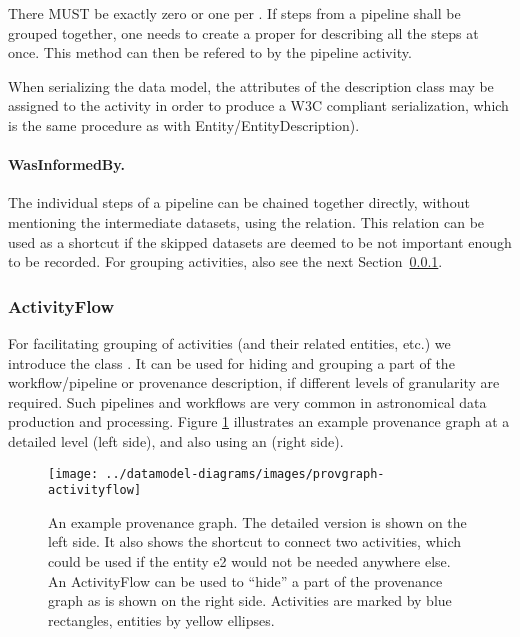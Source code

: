 There MUST be exactly zero or one  per . If steps from a 
pipeline shall be grouped together, one needs to create a proper 
 for describing all the steps at once. This method can then 
be refered to by the pipeline activity. 

When serializing the data model, the attributes
of the description class may be assigned to the activity in order to produce 
a W3C compliant serialization, which is the same procedure as with
 Entity\slash{}EntityDescription).


\paragraph{WasInformedBy.}
The individual steps of a pipeline can be chained together directly, without
mentioning the intermediate datasets, using the  relation.
This relation can be used as a shortcut if the skipped datasets are deemed
to be not important enough to be recorded. For grouping activities, also see
the next Section~\ref{sec:activityflow}.


\subsubsection{ActivityFlow}\label{sec:activityflow}
For facilitating grouping of activities (and their related entities, etc.) we
introduce the class . It can be used for hiding and grouping
a part of the workflow/pipeline  or provenance  description, if different levels
of granularity are required. Such pipelines and workflows are very common in
astronomical data production and processing. Figure
\ref{fig:provgraph-activityflow} illustrates an example provenance graph at a
detailed level (left side), and also using an  (right
side).


\begin{figure}[h]
\centering
\texttt{[image: ../datamodel-diagrams/images/provgraph-activityflow]}
\caption[Example provenance graph with ]{An example provenance graph. The detailed version is shown on the left side. It also shows
the shortcut  to connect two activities, which could be used if the entity e2 
would not be needed anywhere else.
An ActivityFlow can be used to ``hide'' a part of the provenance graph as is shown on the right side.
Activities are marked by blue rectangles, entities by yellow ellipses.}
\label{fig:provgraph-activityflow}
\end{figure}

